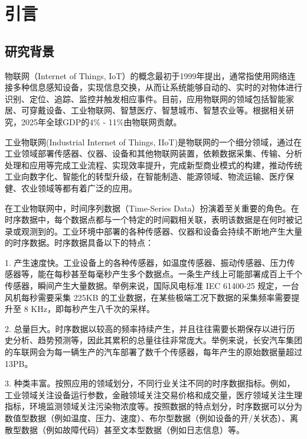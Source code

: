 
\chapter{引言}


\section{研究背景}\label{1-background}


物联网（Internet of Things, IoT）的概念最初于1999年提出，通常指使用网络连接多种信息感知设备，实现信息交换，从而让系统能够自动的、实时的对物体进行识别、定位、追踪、监控并触发相应事件\cite{王保云2009物联网技术研究综述木}。目前，应用物联网的领域包括智能家居、可穿戴设备、工业物联网、智慧医疗、智慧城市、智慧农业等。根据相关研究，2025年全球GDP的4\% - 11\%由物联网贡献\cite{mouha2021internet}。

工业物联网(Industrial Internet of Things, IIoT)\cite{sisinni2018industrial}是物联网的一个细分领域，通过在工业领域部署传感器、仪器、设备和其他物联网装置，依赖数据采集、传输、分析处理和应用等完成工业流程、实现效率提升，完成新型商业模式的构建，推动传统工业向数字化、智能化的转型升级，在智能制造、能源领域、物流运输、医疗保健、农业领域等都有着广泛的应用。

在工业物联网中，时间序列数据（Time-Series Data）\cite{dunning2015tsdb}扮演着至关重要的角色。在时序数据中，每个数据点都与一个特定的时间戳相关联，表明该数据是在何时被记录或观测到的。工业环境中部署的各种传感器、仪器和设备会持续不断地产生大量的时序数据。时序数据具备以下的特点：

1. 产生速度快。工业设备上的各种传感器，如温度传感器、振动传感器、压力传感器等，能在每秒甚至每毫秒产生多个数据点。一条生产线上可能部署成百上千个传感器，瞬间产生大量数据。举例来说，国际风电标准 IEC 61400-25 规定，一台风机每秒需要采集 225KB 的工业数据，在某些极端工况下数据的采集频率需要提升至 8 KHz\cite{PZKX202005001}，即每秒产生八千次的采样。

2. 总量巨大。时序数据以较高的频率持续产生，并且往往需要长期保存以进行历史分析、趋势预测等，因此其累积的总量往往非常庞大。举例来说，长安汽车集团的车联网会为每一辆生产的汽车部署了数千个传感器，每年产生的原始数据量超过13PB。

3. 种类丰富。按照应用的领域划分，不同行业关注不同的时序数据指标。例如，工业领域关注设备运行参数，金融领域关注交易价格和成交量，医疗领域关注生理指标，环境监测领域关注污染物浓度等。按照数据的特点划分，时序数据可以分为数值型数据（例如温度、压力、速度）、布尔型数据（例如设备的开/关状态）、离散型数据（例如故障代码）甚至文本型数据（例如日志信息）等。


